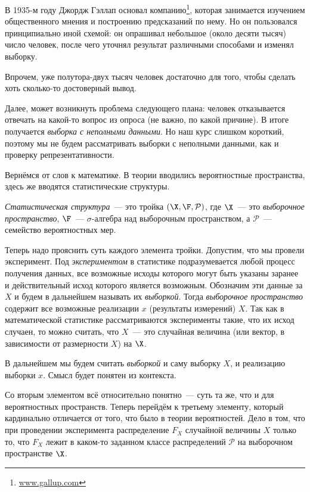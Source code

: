 В 1935-м году Джордж Гэллап основал компанию\footnote{\url{www.gallup.com}}, 
которая занимается изучением общественного мнения и построению предсказаний по 
нему. Но он пользовался принципиально иной схемой: он опрашивал небольшое 
(около десяти тысяч) число человек, после чего уточнял результат различными 
способами и изменял выборку. 

Впрочем, уже полутора-двух тысяч человек достаточно для того, чтобы сделать 
хоть сколько-то достоверный вывод.

Далее, может возникнуть проблема следующего плана: человек отказывается 
отвечать на какой-то вопрос из опроса (не важно, по какой причине). В итоге 
получается \emph{выборка с неполными данными}. Но наш курс слишком короткий, 
поэтому мы не будем рассматривать выборки с неполными данными, как и проверку 
репрезентативности.

Вернёмся от слов к математике. В теории вводились вероятностные пространства, 
здесь же вводятся статистические структуры.
\begin{definition}
	\emph{Статистическая структура}~--- это тройка \((\X, \F, \mathcal{P})\), 
	где \(\X\)~--- это \emph{выборочное пространство}, \(\F\)~--- 
	\(\sigma\)-алгебра над выборочным пространством, а \(\mathcal{P}\)~--- 
	семейство 
	вероятностных мер.
\end{definition}

Теперь надо прояснить суть каждого элемента тройки. Допустим, что мы провели 
эксперимент. Под \emph{экспериментом} в статистике подразумевается любой 
процесс получения данных, все возможные исходы которого могут быть указаны 
заранее и действительный исход которого является возможным. Обозначим эти 
данные за \(X\) и будем в дальнейшем называть их \emph{выборкой}. Тогда 
\emph{выборочное пространство} содержит все возможные реализации \(x\) 
(результаты измерений) \(X\). Так как в математической статистике 
рассматриваются эксперименты такие, что их исход случаен, то можно считать, что 
\(X\)~--- это случайная величина (или вектор, в зависимости от размерности 
\(X\)) на \(\X\).

\begin{remark}
	В дальнейшем мы будем считать \emph{выборкой} и саму выборку \(X\), и 
	реализацию выборки \(x\). Смысл будет понятен из контекста.
\end{remark}

Со вторым элементом всё относительно понятно~--- суть та же, что и для 
вероятностных пространств. Теперь перейдём к третьему элементу, который 
кардинально отличается от того, что было в теории вероятностей. Дело в том, что 
при проведении эксперимента распределение \(F_{X}\) случайной величины \(X\) 
только то, что \(F_{X}\) лежит в каком-то заданном классе распределений 
\(\mathcal{P}\) на выборочном пространстве \(\X\).

